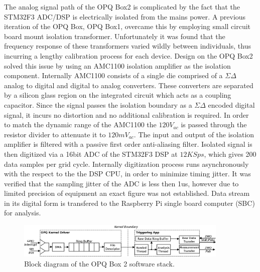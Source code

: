 The analog signal path of the OPQ Box2 is complicated by the fact that the STM32F3 ADC/DSP is electrically isolated from the mains power. A previous iteration of the OPQ Box, OPQ Box1, overcame this by employing small circuit board mount isolation transformer. Unfortunately it was found that the frequency response of these transformers varied wildly between individuals, thus incurring a lengthy calibration process for each device. Design on the OPQ Box2 solved this issue by using an AMC1100 isolation amplifier as the isolation component. Internally AMC1100 consists of a single die comprised of a $\Sigma\Delta$ analog to digital and digital to analog converters. These converters are separated by a silicon glass region on the integrated circuit which acts as a coupling capacitor. Since the signal passes the isolation boundary as a $\Sigma\Delta$ encoded digital signal, it incurs no distortion and no additional calibration is required. In order to match the dynamic range of the AMC1100 the $120V_{ac}$ is passed through the resistor divider to attenuate it to $120mV_{ac}$. The input and output of the isolation amplifier is filtered with a passive first order anti-aliasing filter. Isolated signal is then digitized via a 16bit ADC of the STM32F3 DSP at $12 KSps$, which gives 200 data samples per grid cycle. Internally digitization process runs asynchronously with the respect to the the DSP CPU, in order to minimize timing jitter. It was verified that the sampling jitter of the ADC is less then 1us, however due to limited precision of equipment an exact figure was not established. Data stream in its digital form is transfered to the Raspberry Pi single board computer (SBC) for analysis.

\begin{figure}[h]
  \begin{center}
  \includegraphics[width=0.9\textwidth]{img/opqbox_software.png}
  \end{center}
  \caption{Block diagram of the OPQ Box 2 software stack.}
  \label{fig:3}
\end{figure}


